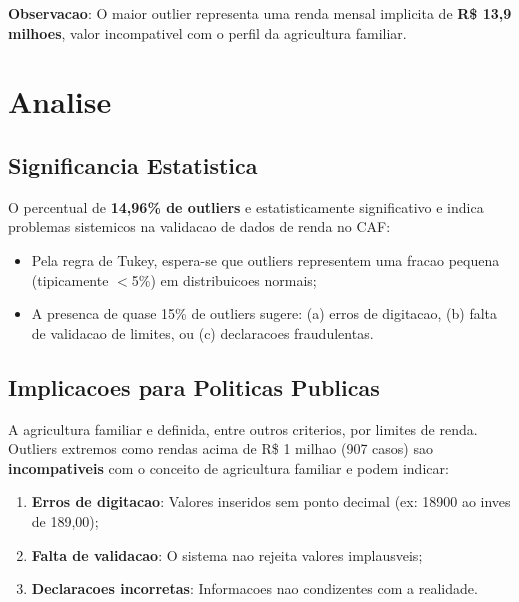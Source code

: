 \documentclass[11pt,a4paper]{article}
\begin{document}
\textbf{Observacao}: O maior outlier representa uma renda mensal implicita de
\textbf{R\$ 13,9 milhoes}, valor incompativel com o perfil da agricultura familiar.

\section{Analise}

\subsection{Significancia Estatistica}

O percentual de \textbf{14,96\% de outliers} e estatisticamente significativo e indica
problemas sistemicos na validacao de dados de renda no CAF:

\begin{itemize}
    \item Pela regra de Tukey, espera-se que outliers representem uma fracao pequena
    (tipicamente $<$5\%) em distribuicoes normais;
    \item A presenca de quase 15\% de outliers sugere: (a) erros de digitacao,
    (b) falta de validacao de limites, ou (c) declaracoes fraudulentas.
\end{itemize}

\subsection{Implicacoes para Politicas Publicas}

A agricultura familiar e definida, entre outros criterios, por limites de renda.
Outliers extremos como rendas acima de R\$ 1 milhao (907 casos) sao \textbf{incompativeis}
com o conceito de agricultura familiar e podem indicar:

\begin{enumerate}
    \item \textbf{Erros de digitacao}: Valores inseridos sem ponto decimal (ex: 18900 ao
    inves de 189,00);
    \item \textbf{Falta de validacao}: O sistema nao rejeita valores implausveis;
    \item \textbf{Declaracoes incorretas}: Informacoes nao condizentes com a realidade.
\end{enumerate}
\end{document}
